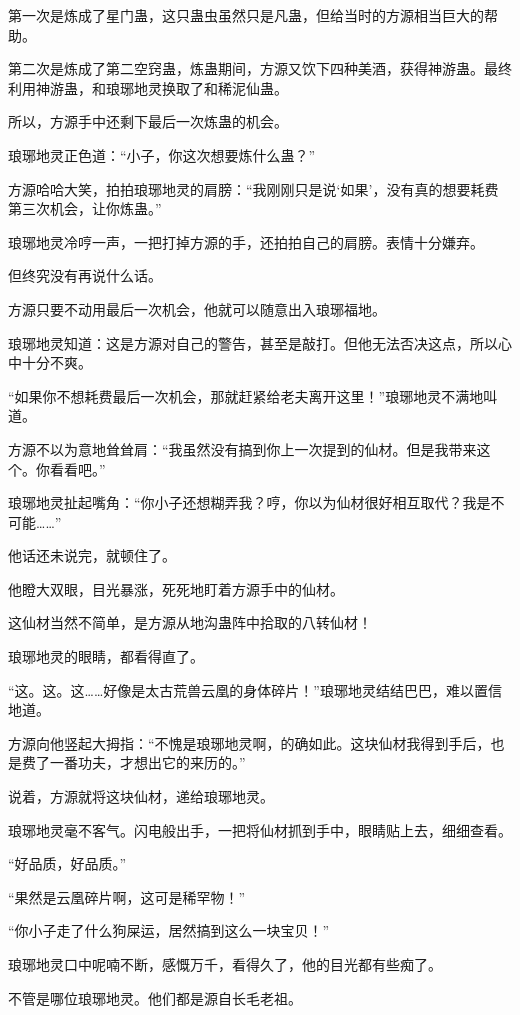 \begin{this_body}
第一次是炼成了星门蛊，这只蛊虫虽然只是凡蛊，但给当时的方源相当巨大的帮助。

第二次是炼成了第二空窍蛊，炼蛊期间，方源又饮下四种美酒，获得神游蛊。最终利用神游蛊，和琅琊地灵换取了和稀泥仙蛊。

所以，方源手中还剩下最后一次炼蛊的机会。

琅琊地灵正色道：“小子，你这次想要炼什么蛊？”

方源哈哈大笑，拍拍琅琊地灵的肩膀：“我刚刚只是说‘如果’，没有真的想要耗费第三次机会，让你炼蛊。”

琅琊地灵冷哼一声，一把打掉方源的手，还拍拍自己的肩膀。表情十分嫌弃。

但终究没有再说什么话。

方源只要不动用最后一次机会，他就可以随意出入琅琊福地。

琅琊地灵知道：这是方源对自己的警告，甚至是敲打。但他无法否决这点，所以心中十分不爽。

“如果你不想耗费最后一次机会，那就赶紧给老夫离开这里！”琅琊地灵不满地叫道。

方源不以为意地耸耸肩：“我虽然没有搞到你上一次提到的仙材。但是我带来这个。你看看吧。”

琅琊地灵扯起嘴角：“你小子还想糊弄我？哼，你以为仙材很好相互取代？我是不可能……”

他话还未说完，就顿住了。

他瞪大双眼，目光暴涨，死死地盯着方源手中的仙材。

这仙材当然不简单，是方源从地沟蛊阵中拾取的八转仙材！

琅琊地灵的眼睛，都看得直了。

“这。这。这……好像是太古荒兽云凰的身体碎片！”琅琊地灵结结巴巴，难以置信地道。

方源向他竖起大拇指：“不愧是琅琊地灵啊，的确如此。这块仙材我得到手后，也是费了一番功夫，才想出它的来历的。”

说着，方源就将这块仙材，递给琅琊地灵。

琅琊地灵毫不客气。闪电般出手，一把将仙材抓到手中，眼睛贴上去，细细查看。

“好品质，好品质。”

“果然是云凰碎片啊，这可是稀罕物！”

“你小子走了什么狗屎运，居然搞到这么一块宝贝！”

琅琊地灵口中呢喃不断，感慨万千，看得久了，他的目光都有些痴了。

不管是哪位琅琊地灵。他们都是源自长毛老祖。


\end{this_body}
